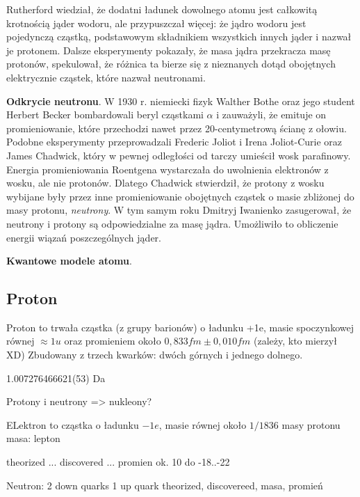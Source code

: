 Rutherford wiedział, że dodatni ładunek dowolnego atomu jest całkowitą krotnością jąder wodoru, ale przypuszczał więcej: że jądro wodoru jest pojedynczą cząstką, podstawowym składnikiem wszystkich innych jąder i nazwał je protonem.
Dalsze eksperymenty pokazały, że masa jądra przekracza masę protonów, spekulował, że różnica ta bierze się z nieznanych dotąd obojętnych elektrycznie cząstek, które nazwał neutronami.

\textbf{Odkrycie neutronu}.
W 1930 r. niemiecki fizyk Walther Bothe oraz jego student Herbert Becker bombardowali beryl cząstkami $\alpha$ i zauważyli, że emituje on promieniowanie, które przechodzi nawet przez 20-centymetrową ścianę z ołowiu.
Podobne eksperymenty przeprowadzali Frederic Joliot i Irena Joliot-Curie oraz James Chadwick, który w pewnej odległości od tarczy umieścił wosk parafinowy.
Energia promieniowania Roentgena wystarczała do uwolnienia elektronów z wosku, ale nie protonów.
Dlatego Chadwick stwierdził, że protony z wosku wybijane były przez inne promieniowanie obojętnych cząstek o masie zbliżonej do masy protonu, \emph{neutrony}.
W tym samym roku Dmitryj Iwanienko zasugerował, że neutrony i protony są odpowiedzialne za masę jądra.
Umożliwiło to obliczenie energii wiązań poszczególnych jąder.

\textbf{Kwantowe modele atomu}.


\subsection{Proton}
Proton to trwała cząstka (z grupy barionów) o ładunku +1e, masie spoczynkowej równej $\approx 1 u$ oraz promieniem około $0,833 fm \pm 0,010 fm$ (zależy, kto mierzył XD)
Zbudowany z trzech kwarków: dwóch górnych i jednego dolnego.

1.007276466621(53) Da

Protony i neutrony => nukleony?






ELektron to cząstka o ładunku $-1e$, masie równej około $1/1836$ masy protonu
masa: %
lepton

theorized ... discovered ... promien ok. 10 do -18..-22




Neutron:
2 down quarks
1 up quark
theorized, discovereed, masa, promień